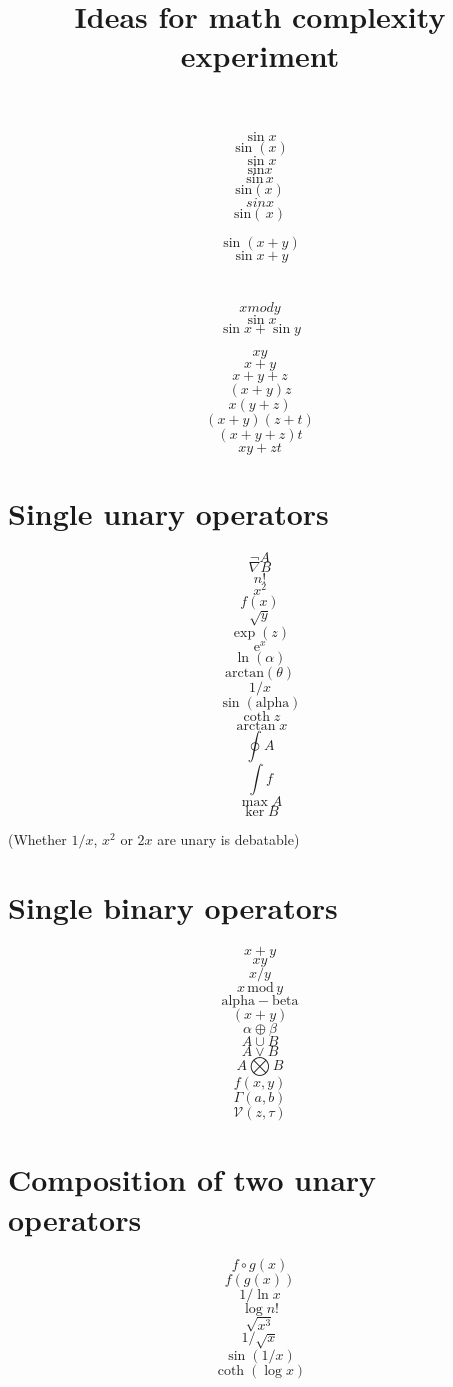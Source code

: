 \documentclass[12pt]{article}
\begin{document}
\title{Ideas for math complexity experiment}
\author{}
\maketitle

\tableofcontents

$$\sin x $$
$$\sin(x) $$
$$\sin{x} $$
$$\mathrm{sin}x $$
$$\mathrm{sin}\,x $$
$$\mathrm{sin}(x) $$
$$ sin x $$
$$\mathrm{sin}(\,x)$$

$$\sin (x+y)$$
$$\sin x+y$$

\clearpage
\section{}

$$ x mod y $$
$$ \sin x $$
$$ \sin x + \sin y $$

$$ xy $$
$$ x + y $$
$$ x + y + z $$
$$ (x + y)z $$
$$ x(y + z) $$
$$ (x + y)(z + t) $$
$$ (x + y + z)t $$
$$ xy + zt $$


\section{Single unary operators}

$$ \neg A $$
$$ \nabla B $$
$$ n! $$
$$ x^2 $$
$$ f(x) $$
$$ \sqrt{y} $$
$$ \exp(z) $$
$$ \mathrm{e}^x $$
$$ \ln(\alpha) $$
$$ \mathrm{arctan}(\theta) $$
$$ 1/x $$
$$ \sin(\mathrm{alpha}) $$
$$ \coth{z} $$
$$ \arctan{x} $$
$$ \oint A $$
$$ \int f $$
$$ \max{A} $$
$$ \ker{B} $$

(Whether $1/x$, $x^2$ or  $2x$ are unary is debatable)

\clearpage
\section{Single binary operators}

$$ x + y $$
$$ xy $$
$$ x/y $$
$$ x\, \mathrm{mod}\, y $$
$$ \mathrm{alpha} - \mathrm{beta} $$
$$ (x + y) $$
$$ \alpha \oplus \beta $$
$$ A \cup B $$
$$ A \vee B $$
$$ A \bigotimes B $$
$$ f(x, y) $$
$$ \Gamma(a,b) $$
$$ \mathcal{V}(z, \tau) $$

\clearpage
\section{Composition of two unary operators}

$$ f \circ g (x) $$
$$ f(g(x)) $$
$$ 1/ \ln x $$
$$ \log{n!} $$
$$ \sqrt{x^3} $$
$$ 1/\sqrt{x} $$
$$ \sin{(1/x)} $$
$$ \coth{(\log{x})} $$
\end{document}
